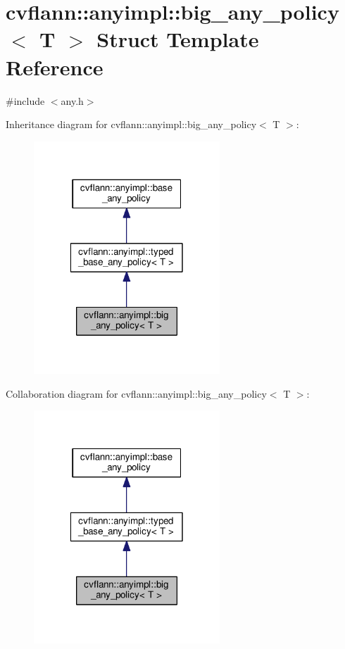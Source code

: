 \hypertarget{structcvflann_1_1anyimpl_1_1big__any__policy}{\section{cvflann\-:\-:anyimpl\-:\-:big\-\_\-any\-\_\-policy$<$ T $>$ Struct Template Reference}
\label{structcvflann_1_1anyimpl_1_1big__any__policy}
}


{\ttfamily \#include $<$any.\-h$>$}



Inheritance diagram for cvflann\-:\-:anyimpl\-:\-:big\-\_\-any\-\_\-policy$<$ T $>$\-:\nopagebreak
\begin{figure}[H]
\begin{center}
\leavevmode
\includegraphics[width=198pt]{structcvflann_1_1anyimpl_1_1big__any__policy__inherit__graph}
\end{center}
\end{figure}


Collaboration diagram for cvflann\-:\-:anyimpl\-:\-:big\-\_\-any\-\_\-policy$<$ T $>$\-:\nopagebreak
\begin{figure}[H]
\begin{center}
\leavevmode
\includegraphics[width=198pt]{structcvflann_1_1anyimpl_1_1big__any__policy__coll__graph}
\end{center}
\end{figure}
